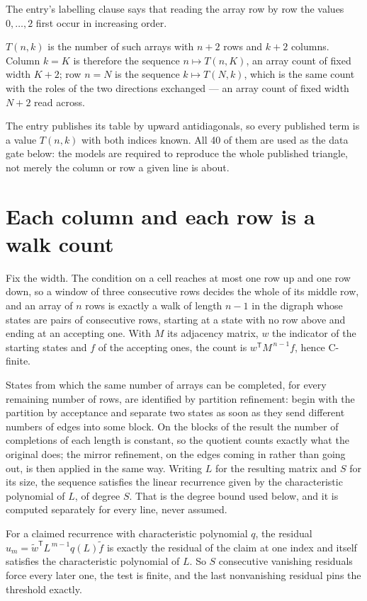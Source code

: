 \documentclass[11pt]{article}
\theoremstyle{definition}
\begin{document}
The entry's labelling clause says that reading the array row by row the values $0,\dots,2$ first occur in increasing order.

$T(n,k)$ is the number of such arrays with $n + 2$ rows and $k + 2$ columns. Column $k = K$ is therefore the sequence $n \mapsto T(n,K)$, an array count of fixed width $K + 2$; row $n = N$ is the sequence $k \mapsto T(N,k)$, which is the same count with the roles of the two directions exchanged --- an array count of fixed width $N + 2$ read across.

The entry publishes its table by upward antidiagonals, so every published term is a value $T(n,k)$ with both indices known. All 40 of them are used as the data gate below: the models are required to reproduce the whole published triangle, not merely the column or row a given line is about.

\section{Each column and each row is a walk count}

Fix the width. The condition on a cell reaches at most one row up and one row down, so a window of three consecutive rows decides the whole of its middle row, and an array of $n$ rows is exactly a walk of length $n-1$ in the digraph whose states are pairs of consecutive rows, starting at a state with no row above and ending at an accepting one. With $M$ its adjacency matrix, $w$ the indicator of the starting states and $f$ of the accepting ones, the count is $w^{\mathsf T}M^{\,n-1}f$, hence C-finite.

States from which the same number of arrays can be completed, for every remaining number of rows, are identified by partition refinement: begin with the partition by acceptance and separate two states as soon as they send different numbers of edges into some block. On the blocks of the result the number of completions of each length is constant, so the quotient counts exactly what the original does; the mirror refinement, on the edges coming in rather than going out, is then applied in the same way. Writing $L$ for the resulting matrix and $S$ for its size, the sequence satisfies the linear recurrence given by the characteristic polynomial of $L$, of degree $S$. That is the degree bound used below, and it is computed separately for every line, never assumed.

For a claimed recurrence with characteristic polynomial $q$, the residual $u_m = \tilde w^{\mathsf T}L^{\,m-1}q(L)\tilde f$ is exactly the residual of the claim at one index and itself satisfies the characteristic polynomial of $L$. So $S$ consecutive vanishing residuals force every later one, the test is finite, and the last nonvanishing residual pins the threshold exactly.
\end{document}
